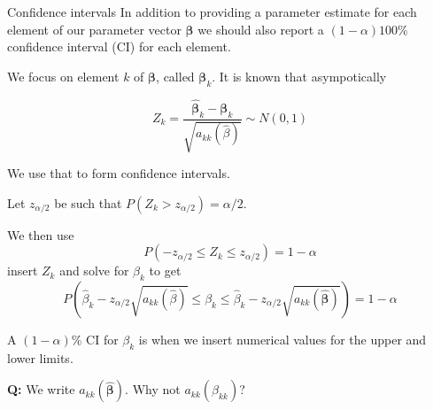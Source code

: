 \documentclass[
  ignorenonframetext,
]{beamer}
\begin{document}
\begin{frame}
\begin{block}{Confidence intervals}
\label{confidence-intervals}
In addition to providing a parameter estimate for each element of our
parameter vector \(\boldsymbol{\beta}\) we should also report a
\((1-\alpha)100\)\% confidence interval (CI) for each element.

We focus on element \(k\) of \(\boldsymbol{\beta}\), called
\(\boldsymbol{\beta}_k\). It is known that asympotically

\[
Z_k=\frac{\hat{\boldsymbol{\beta}}_k-\boldsymbol{\beta}_k}{\sqrt{{a}_{kk}(\hat{\beta})}} \sim N(0,1)
\]

We use that to form confidence intervals.

Let \(z_{\alpha/2}\) be such that \(P(Z_k>z_{\alpha/2})=\alpha/2\).
\end{block}
\end{frame}

\begin{frame}
We then use \[ P(-z_{\alpha/2}\le Z_k \le z_{\alpha/2})=1-\alpha\]
insert \(Z_k\) and solve for \(\beta_k\) to get
\[ P(\hat{\beta}_k-z_{\alpha/2}\sqrt{a_{kk}(\hat{\beta})}
\le \beta_k \le \hat{\beta}_k-z_{\alpha/2}\sqrt{a_{kk}(\hat{\boldsymbol{\beta}})})=1-\alpha\]

A \((1-\alpha)\)\% CI for \(\beta_k\) is when we insert numerical values
for the upper and lower limits.

\textbf{Q:} We write \(a_{kk}(\hat{\boldsymbol{\beta}})\). Why not
\(a_{kk}(\hat{\beta}_{kk})\)?
\end{frame}
\end{document}
